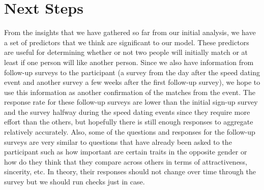\documentclass{article}
\begin{document}
 
 

\section{Next Steps}
From the insights that we have gathered so far from our initial analysis, we have a set of predictors that we think are significant to our model.  These predictors are useful for determining whether or not two people will initially match or at least if one person will like another person.  Since we also have information from follow-up surveys to the participant (a survey from the day after the speed dating event and another survey a few weeks after the first follow-up survey), we hope to use this information as another confirmation of the matches from the event.  The response rate for these follow-up surveys are lower than the initial sign-up survey and the survey halfway during the speed dating events since they require more effort than the others, but hopefully there is still enough responses to aggregate relatively accurately.  Also, some of the questions and responses for the follow-up surveys are very similar to questions that have already been asked to the participant such as how important are certain traits in the opposite gender or how do they think that they compare across others in terms of attractiveness, sincerity, etc.  In theory, their responses should not change over time through the survey but we should run checks just in case.
\end{document}
